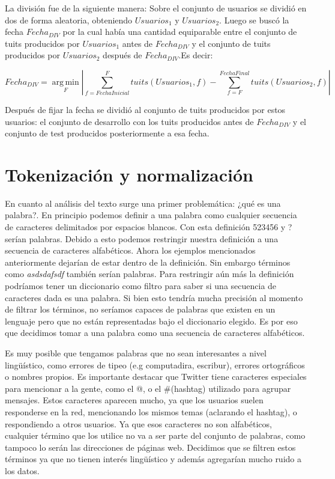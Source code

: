 La división fue de la siguiente manera:
Sobre el conjunto de usuarios se dividió en dos de forma aleatoria, obteniendo $Usuarios_1$ y $Usuarios_2$. Luego se buscó la fecha $Fecha_{DIV}$ por la cual había una cantidad equiparable entre el conjunto de tuits producidos por  $Usuarios_1$ antes de $Fecha_{DIV}$ y el conjunto de tuits producidos por $Usuarios_2$ después de $Fecha_{DIV}$.Es decir:

\begin{equation}
 Fecha_{DIV}  = \operatorname*{arg\,min}_{F} \left|\sum_{ f = FechaInicial}^{F} tuits(Usuarios_1,f) - \sum_{ f = F}^{FechaFinal} tuits(Usuarios_2,f)\right|
\end{equation}

Después de fijar la fecha se dividió al conjunto de tuits producidos por estos usuarios: el conjunto de desarrollo con los tuits producidos antes de $Fecha_{DIV}$ y el conjunto de test producidos posteriormente a esa fecha.

\section{Tokenización y normalización}


En cuanto al análisis del texto surge una primer problemática: ¿qué es una palabra?. En principio podemos definir a una palabra como cualquier secuencia de caracteres delimitados por espacios blancos. Con esta definición 523456 y ? serían palabras. Debido a esto podemos restringir nuestra definición a una secuencia de caracteres alfabéticos. Ahora los ejemplos mencionados anteriormente dejarían de estar dentro de la definición. Sin embargo términos como \textit{asdsdafsdf} también serían palabras. Para restringir aún más la definición podríamos tener un diccionario como filtro para saber si una secuencia de caracteres dada es una palabra. Si bien esto tendría mucha precisión al momento de filtrar los términos, no seríamos capaces de palabras que existen en un lenguaje pero que no están representadas bajo el diccionario elegido. Es por eso que decidimos tomar a una palabra como una secuencia de caracteres alfabéticos.

Es muy posible que tengamos palabras que no sean interesantes a nivel lingüístico, como errores de tipeo (e.g computadira, escribur), errores ortográficos o  nombres propios. Es importante destacar que Twitter tiene caracteres especiales para mencionar a la gente, como el @, o el \#(hashtag) utilizado para agrupar mensajes. Estos caracteres aparecen mucho, ya que los usuarios suelen responderse en la red, mencionando los mismos temas (aclarando el hashtag), o respondiendo a otros usuarios. Ya que esos caracteres no son alfabéticos, cualquier término que los utilice no va a ser parte del conjunto de palabras, como tampoco lo serán las direcciones de páginas web. Decidimos que se filtren estos términos ya que no tienen interés lingüístico y además agregarían mucho ruido a los datos.

